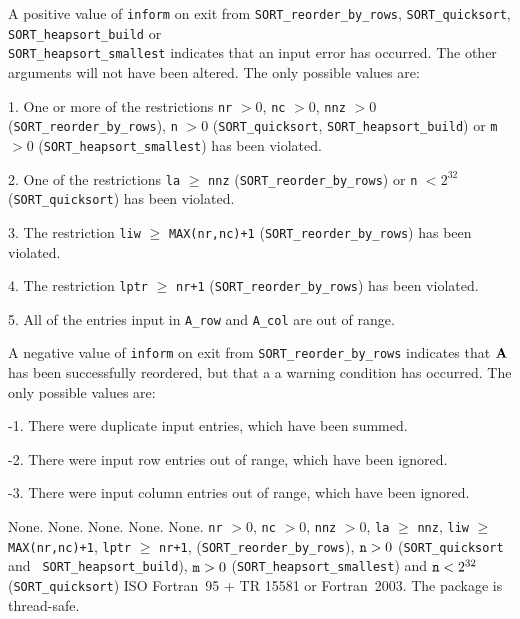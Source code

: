 \documentclass{galahad}
\newcommand{\packagename}{SORT}
\begin{document}

\galerrors
A positive value of {\tt inform} on exit from
{\tt \packagename\_reorder\_by\_rows},
{\tt \packagename\_quicksort},
{\tt \packagename\_heapsort\_build}
or \\
{\tt \packagename\_heapsort\_smallest}
indicates that an input error has occurred.
The other arguments will not have been altered.
The only possible values are:

\begin{description}
\item{1.} One or more of the restrictions
{\tt nr} $> 0$,
{\tt nc} $> 0$,
{\tt nnz} $> 0$
({\tt \packagename\_reorder\_by\_rows}),
{\tt n} $> 0$ ({\tt \packagename\_quicksort},
{\tt \packagename\_heapsort\_build})
or {\tt m} $> 0$ ({\tt \packagename\_heapsort\_smallest})
has been violated.
\item{2.} One of the restrictions
{\tt la} $\geq$ {\tt nnz}
({\tt \packagename\_reorder\_by\_rows})
or
{\tt n} $< 2^{32}$ ({\tt \packagename\_quicksort})
has been violated.
\item{3.} The restriction
{\tt liw} $\geq$ {\tt MAX(nr,nc)+1}
({\tt \packagename\_reorder\_by\_rows})
has been violated.
\item{4.} The restriction
{\tt lptr} $\geq$ {\tt nr+1}
({\tt \packagename\_reorder\_by\_rows})
has been violated.
\item{5.} All of the entries input in {\tt A\_row} and {\tt A\_col}
are out of range.
\end{description}

A negative value of {\tt inform} on exit from
{\tt \packagename\_reorder\_by\_rows} indicates
that ${\mathbf{A}}$ has been successfully reordered, but that a
a warning condition has occurred.
The only possible values are:

\begin{description}
\item{-1.} There were duplicate input entries, which have been summed.
\item{-2.} There were input row entries out of range, which have been ignored.
\item{-3.} There were input column entries out of range, which have been
ignored.
\end{description}


\galgeneral

\galcommon None.
\galworkspace None.
\galroutines None.
\galmodules None.
\galio None.
\galrestrictions
{\tt nr} $> 0$,
{\tt nc} $> 0$,
{\tt nnz} $> 0$,
{\tt la} $\geq$ {\tt nnz},
{\tt liw} $\geq$ {\tt MAX(nr,nc)+1},
{\tt lptr} $\geq$ {\tt nr+1},
({\tt \packagename\_reorder\_by\_rows}),
${\tt n} > 0$ ({\tt \packagename\_quicksort} and {\tt
\packagename\_heapsort\_build}),
${\tt m} > 0$ ({\tt \packagename\_heapsort\_smallest}) and
${\tt n} < 2^{32}$ \\ ({\tt \packagename\_quicksort})
\galportability ISO Fortran~95 + TR 15581 or Fortran~2003.
The package is thread-safe.
\end{document}
